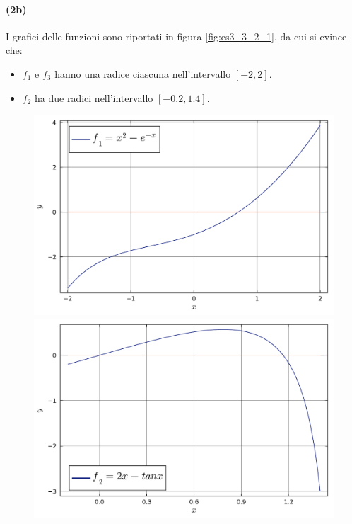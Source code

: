 \documentclass[letterpaper, 12pt]{article}
\numberwithin{equation}{section}    %
\begin{document}
\paragraph{(2b)}\label{sec:332_2b}I grafici delle funzioni sono riportati in figura \ref{fig:es3_3_2_1}, 
da cui si evince che:
\begin{itemize}
    \item $f_1$ e $f_3$ hanno una radice ciascuna nell'intervallo $[-2,2]$.
    \item $f_2$ ha due radici nell'intervallo $[-0.2,1.4]$.
\end{itemize}

\begin{figure}[!ht]
    \centering
    \begin{minipage}[b]{0.31\textwidth}
        \includegraphics[width=\textwidth]{3321.pdf}
        \caption*{}
    \end{minipage}
    \hspace{0.2cm}
    \begin{minipage}[b]{0.31\textwidth}
        \includegraphics[width=\textwidth]{3322.pdf}

\end{minipage}
\end{figure}
\end{document}
